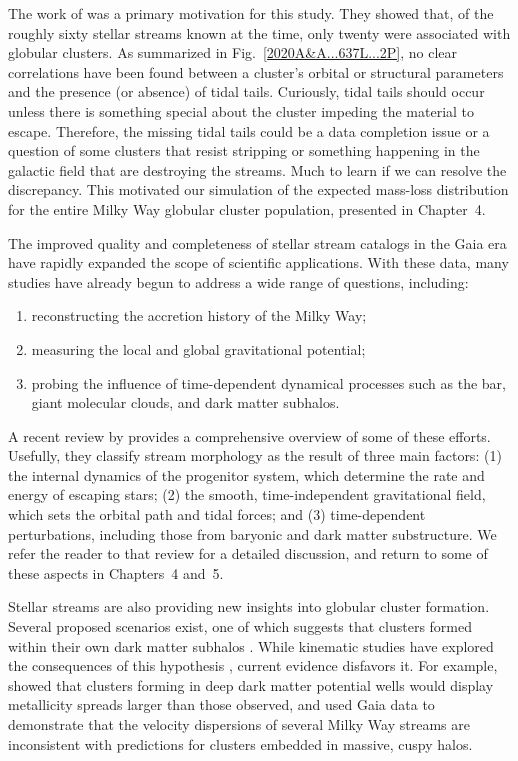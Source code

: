     The work of \citet{2021ApJ...914..123I} was a primary motivation for this study. They showed that, of the roughly sixty stellar streams known at the time, only twenty were associated with globular clusters.  As summarized in Fig.~\ref{2020A&A...637L...2P}, no clear correlations have been found between a cluster's orbital or structural parameters and the presence (or absence) of tidal tails. Curiously, tidal tails should occur unless there is something special about the cluster impeding the material to escape. Therefore, the missing tidal tails could be a data completion issue or a question of some clusters that resist stripping or something happening in the galactic field that are destroying the streams. Much to learn if we can resolve the discrepancy. This motivated our simulation of the expected mass-loss distribution for the entire Milky Way globular cluster population, presented in Chapter~4.

    The improved quality and completeness of stellar stream catalogs in the Gaia era have rapidly expanded the scope of scientific applications. With these data, many studies have already begun to address a wide range of questions, including:  
    \begin{enumerate}
        \item reconstructing the accretion history of the Milky Way;
        \item measuring the local and global gravitational potential;
        \item probing the influence of time-dependent dynamical processes such as the bar, giant molecular clouds, and dark matter subhalos.
    \end{enumerate}
    A recent review by \citet{2025NewAR.10001713B} provides a comprehensive overview of some of these efforts. Usefully, they classify stream morphology as the result of three main factors: (1) the internal dynamics of the progenitor system, which determine the rate and energy of escaping stars; (2) the smooth, time-independent gravitational field, which sets the orbital path and tidal forces; and (3) time-dependent perturbations, including those from baryonic and dark matter substructure. We refer the reader to that review for a detailed discussion, and return to some of these aspects in Chapters~4 and~5.

    Stellar streams are also providing new insights into globular cluster formation. Several proposed scenarios exist, one of which suggests that clusters formed within their own dark matter subhalos \citep{2025arXiv250116438K}. While kinematic studies have explored the consequences of this hypothesis \citep{2022A&A...667A.112V}, current evidence disfavors it. For example, \citet{2016ApJ...823...52K} showed that clusters forming in deep dark matter potential wells would display metallicity spreads larger than those observed, and \citet{2022ApJ...941L..38M} used Gaia data to demonstrate that the velocity dispersions of several Milky Way streams are inconsistent with predictions for clusters embedded in massive, cuspy halos.


